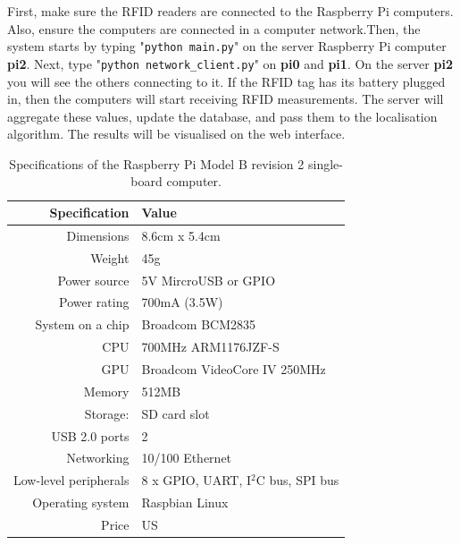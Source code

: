 \documentclass[a4paper,11pt]{scrartcl}
\begin{document}
First, make sure the RFID readers are connected to the Raspberry Pi computers. Also, ensure the computers are connected in a computer network.Then, the system starts by typing "\verb!python main.py!" on the server Raspberry Pi computer \textbf{pi2}. Next, type "\verb!python network_client.py!" on \textbf{pi0} and \textbf{pi1}. On the server \textbf{pi2} you will see the others connecting to it. If the RFID tag has its battery plugged in, then the computers will start receiving RFID measurements. The server will aggregate these values, update the database, and pass them to the localisation algorithm. The results will be visualised on the web interface.

\newpage

\begin{table}[H]
	\centering
	\begin{tabular}{ | r || l | }
		\hline
		\textbf{Specification}	& \textbf{Value} \\ \hline
		Dimensions				& 8.6cm x 5.4cm \\ \hline
		Weight					& 45g \\ \hline
		Power source			& 5V MircroUSB or GPIO \\ \hline
		Power rating			& 700mA (3.5W) \\ \hline
		System on a chip		& Broadcom BCM2835 \\ \hline
		CPU						& 700MHz ARM1176JZF-S \\ \hline
		GPU						& Broadcom VideoCore IV 250MHz \\ \hline
		Memory					& 512MB \\ \hline
		Storage:				& SD card slot \\ \hline
		USB	2.0 ports			& 2 \\ \hline
		Networking				& 10/100 Ethernet \\ \hline
		Low-level peripherals	& 8 x GPIO, UART, I$^{2}$C bus, SPI bus \\ \hline
		Operating system		& Raspbian Linux \\ \hline
		Price					& US \textdollar 35 \\ \hline
	\end{tabular}
	\caption{Specifications of the Raspberry Pi Model B revision 2 single-board computer.}
\end{table}
\end{document}

